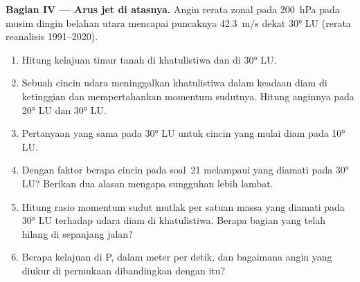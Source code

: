 \begin{problem}
\medskip
\noindent\textbf{Bagian IV --- Arus jet di atasnya.} Angin rerata zonal pada \qty{200}{hPa} pada musim dingin belahan utara mencapai puncaknya \qty{42.3}{m/s} dekat \ang{30} LU (rerata reanalisis 1991--2020).
\begin{enumerate}[resume]
  \item Hitung kelajuan timur tanah di khatulistiwa dan di \ang{30} LU.
  \item Sebuah cincin udara meninggalkan khatulistiwa dalam keadaan diam di ketinggian dan
        mempertahankan momentum sudutnya. Hitung anginnya pada \ang{20} LU dan \ang{30} LU.
  \item Pertanyaan yang sama pada \ang{30} LU untuk cincin yang mulai diam pada \ang{10} LU.
  \item Dengan faktor berapa cincin pada soal~21 melampaui  yang
        diamati pada \ang{30} LU? Berikan dua alasan mengapa  sungguhan lebih lambat.
  \item Hitung rasio momentum sudut mutlak per satuan massa  yang diamati
        pada \ang{30} LU terhadap udara diam di khatulistiwa. Berapa bagian yang telah
        hilang di sepanjang jalan?
  \item Berapa kelajuan  di P, dalam meter per detik, dan bagaimana
        angin yang diukur di permukaan dibandingkan dengan itu?
\end{enumerate}
\end{problem}
